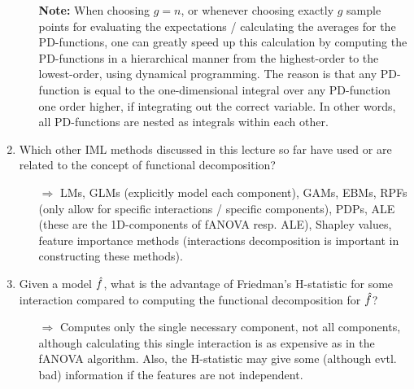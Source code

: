 \begin{enumerate}
\begin{itemize}
            \textbf{Note:}
            When choosing $g = n$, or whenever choosing exactly $g$ sample points for evaluating the expectations / calculating the averages for the PD-functions, one can greatly speed up this calculation by computing the PD-functions in a hierarchical manner from the highest-order to the lowest-order, using dynamical programming.
            The reason is that any PD-function is equal to the one-dimensional integral over any PD-function one order higher, if integrating out the correct variable.
            In other words, all PD-functions are nested as integrals within each other.
    \end{itemize}
    \item 
    Which other IML methods discussed in this lecture so far have used or are related to the concept of functional decomposition?
    \begin{itemize}
        \item[$\Rightarrow$] LMs, GLMs (explicitly model each component), GAMs, EBMs, RPFs (only allow for specific interactions / specific components), PDPs, ALE (these are the 1D-components of fANOVA resp. ALE), Shapley values, feature importance methods (interactions decomposition is important in constructing these methods).
    \end{itemize}
    \item 
    Given a model $\hat{f}$, what is the advantage of Friedman's H-statistic for some interaction compared to computing the functional decomposition for $\hat{f}$?
    \begin{itemize}
        \item[$\Rightarrow$] Computes only the single necessary component, not all components, although calculating this single interaction is as expensive as in the fANOVA algorithm.
        Also, the H-statistic may give some (although evtl. bad) information if the features are not independent.
    \end{itemize}


\end{enumerate}
